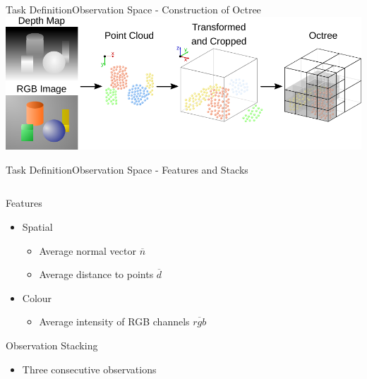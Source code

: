 \begin{frame}{Task Definition}{Observation Space - Construction of Octree}
    \centering
    \includegraphics[width=\textwidth]{graphics/octree_creation_sketch.pdf}
\end{frame}

\begin{frame}{Task Definition}{Observation Space - Features and Stacks}
    \begin{columns}%
        \begin{column}{0.5\textwidth}%
            \begin{block}{Features}
                \begin{itemize}
                    \item Spatial
                          \begin{itemize}
                              \item Average normal vector \(\overline{n}\)
                              \item Average distance to points \(\overline{d}\)
                          \end{itemize}
                    \item Colour
                          \begin{itemize}
                              \item Average intensity of RGB channels \(\overline{rgb}\)
                          \end{itemize}
                \end{itemize}
            \end{block}
            \begin{block}{Observation Stacking}
                \begin{itemize}
                    \item Three consecutive observations
                \end{itemize}
            \end{block}
        \end{column}

\end{columns}
\end{frame}
